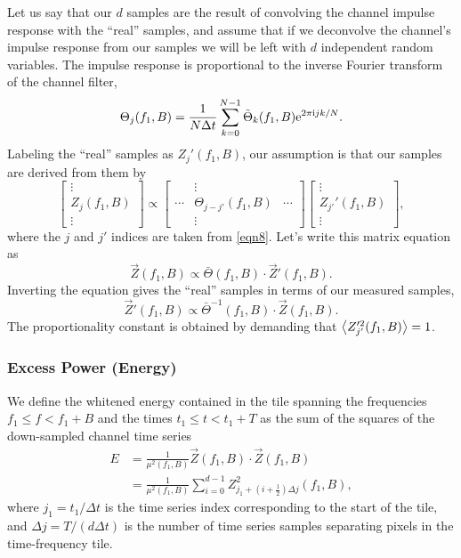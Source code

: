\documentclass{article}
\begin{document}
Let us say that our \(d\) samples are the result of convolving the channel
impulse response with the ``real'' samples, and assume that if we
deconvolve the channel's impulse response from our samples we will be left
with \(d\) independent random variables.  The impulse response is
proportional to the inverse Fourier transform of the channel filter,
\begin{equation}
\Theta_{j}(f_{1}, B)
   = \frac{1}{N \Delta t} \sum_{k = 0}^{N - 1} \tilde{\Theta}_{k}(f_{1}, B)
   \mathrm{e}^{2 \pi \mathrm{i} j k / N}.
\end{equation}
Labeling the ``real'' samples as \(Z_{j}'(f_{1}, B)\), our assumption is
that our samples are derived from them by
\begin{equation}
\begin{bmatrix}
\vdots \\
Z_{j}(f_{1}, B) \\
\vdots
\end{bmatrix}
   \propto \begin{bmatrix}
   & \vdots & \\
   \cdots & \Theta_{j - j'}(f_{1}, B) & \cdots \\
   & \vdots &
   \end{bmatrix}
   \begin{bmatrix}
   \vdots \\
   Z_{j'}'(f_{1}, B) \\
   \vdots
   \end{bmatrix},
\end{equation}
where the \(j\) and \(j'\) indices are taken from \eqref{eqn8}.  Let's
write this matrix equation as
\begin{equation}
\vec{Z}(f_{1}, B)
   \propto \bar{\Theta}(f_{1}, B) \cdot \vec{Z}'(f_{1}, B).
\end{equation}
Inverting the equation gives the ``real'' samples in terms of our measured
samples,
\begin{equation}
\vec{Z}'(f_{1}, B)
   \propto \bar{\Theta}^{-1}(f_{1}, B) \cdot \vec{Z}(f_{1}, B).
\end{equation}
The proportionality constant is obtained by demanding that
\(\left\langle Z_{j'}'^{2}(f_{1}, B)\right\rangle = 1\).


\subsubsection{Excess Power (Energy)}


We define the whitened energy contained in the tile spanning the
frequencies \(f_{1} \leq f < f_{1} + B\) and the times \(t_{1} \leq t <
t_{1} + T\) as the sum of the squares of the down-sampled channel time
series
\begin{align}
E
   & = \frac{1}{\mu^{2}(f_{1}, B)} \vec{Z}(f_{1}, B) \cdot \vec{Z}(f_{1},
   B)
   \\
\label{eqn6}
   & = \frac{1}{\mu^{2}(f_{1}, B)} \sum_{i = 0}^{d - 1} Z_{j_{1} + (i +
   \frac{1}{2}) \Delta j}^{2}(f_{1}, B),
\end{align}
where \(j_{1} = t_{1} / \Delta t\) is the time series index corresponding
to the start of the tile, and \(\Delta j = T / (d \Delta t)\) is the number
of time series samples separating pixels in the time-frequency tile.
\end{document}
